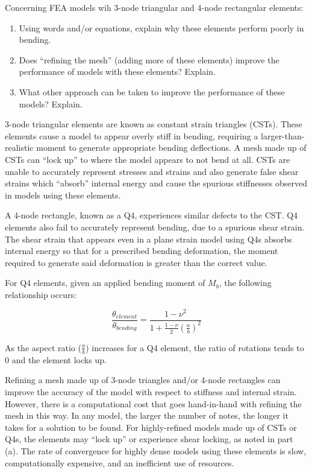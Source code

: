 \documentclass[../main.tex]{subfiles}
\begin{document}

Concerning FEA models wih 3-node triangular and 4-node rectangular elements:

\begin{enumerate}[label=\alph*)]
    \item Using words and/or equations, explain why these elements perform poorly in bending.
    \item Does ``refining the mesh'' (adding more of these elements) improve the performance of models with these elements? Explain.
    \item What other approach can be taken to improve the performance of these models? Explain.
\end{enumerate}


3-node triangular elements are known as constant strain triangles (CSTs).
These elements cause a model to appear overly stiff in bending, requiring a larger-than-realistic moment to generate appropriate bending deflections.
A mesh made up of CSTs can ``lock up'' to where the model appears to not bend at all.
CSTs are unable to accurately represent stresses and strains and also generate false shear strains which ``absorb'' internal energy and cause the spurious stiffnesses observed in models using these elements.

A 4-node rectangle, known as a Q4, experiences similar defects to the CST.
Q4 elements also fail to accurately represent bending, due to a spurious shear strain.
The shear strain that appears even in a plane strain model using Q4s absorbs internal energy so that for a prescribed bending deformation, the moment required to generate said deformation is greater than the correct value.

For Q4 elements, given an applied bending moment of \(M_b\), the following relationship occurs:

\[
    \frac{\theta_{element}}{\theta_{bending}}
    =
    \frac{1-\nu^2}{1+ \frac{1-\nu}{2}(\frac{a}{b})^2}
\]

As the aspect ratio (\(\frac{a}{b}\)) increases for a Q4 element, the ratio of rotations tends to 0 and the element locks up. 


Refining a mesh made up of 3-node triangles and/or 4-node rectangles can improve the accuracy of the model with respect to stiffness and internal strain.
However, there is a computational cost that goes hand-in-hand with refining the mesh in this way.
In any model, the larger the number of notes, the longer it takes for a solution to be found. 
For highly-refined models made up of CSTs or Q4s, the elements may ``lock up'' or experience shear locking, as noted in part (a).
The rate of convergence for highly dense models using these elements is slow, computationally expensive, and an inefficient use of resources.
\end{document}
